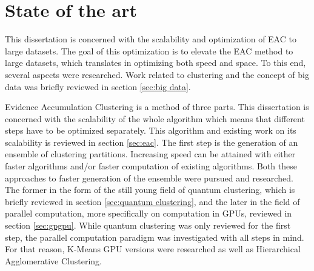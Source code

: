 
\chapter{State of the art}
\label{chapter:stateofart}


This dissertation is concerned with the scalability and optimization of EAC to large datasets.
The goal of this optimization is to elevate the EAC method to large datasets, which translates in optimizing both speed and space.
To this end, several aspects were researched.
Work related to clustering and the concept of big data was briefly reviewed in section \ref{sec:big data}.


Evidence Accumulation Clustering is a method of three parts.
This dissertation is concerned with the scalability of the whole algorithm which means that different steps have to be optimized separately.
This algorithm and existing work on its scalability is reviewed in section \ref{sec:eac}.
The first step is the generation of an ensemble of clustering partitions.
Increasing speed can be attained with either faster algorithms and/or faster computation of existing algorithms.
Both these approaches to faster generation of the ensemble were pursued and researched.
The former in the form of the still young field of quantum clustering, which is briefly reviewed in section \ref{sec:quantum clustering}, and the later in the field of parallel computation, more specifically on computation in GPUs, reviewed in section \ref{sec:gpgpu}.
While quantum clustering was only reviewed for the first step, the parallel computation paradigm was investigated with all steps in mind.
For that reason, K-Means GPU versions were researched as well as Hierarchical Agglomerative Clustering.




